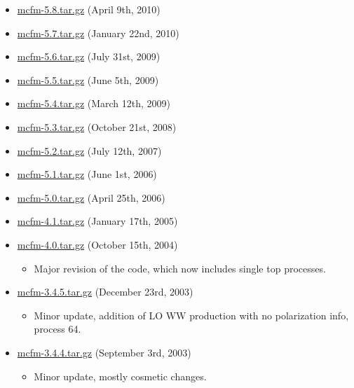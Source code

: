 \begin{itemize}
\item \href{https://mcfm.fnal.gov/downloads/mcfm-5.8.tar.gz}{mcfm-5.8.tar.gz} (April 9th, 2010)
\item \href{https://mcfm.fnal.gov/downloads/mcfm-5.7.tar.gz}{mcfm-5.7.tar.gz} (January 22nd, 2010)
\item \href{https://mcfm.fnal.gov/downloads/mcfm-5.6.tar.gz}{mcfm-5.6.tar.gz} (July 31st, 2009)
\item \href{https://mcfm.fnal.gov/downloads/mcfm-5.5.tar.gz}{mcfm-5.5.tar.gz} (June 5th, 2009)
\item \href{https://mcfm.fnal.gov/downloads/mcfm-5.4.tar.gz}{mcfm-5.4.tar.gz} (March 12th, 2009)
\item \href{https://mcfm.fnal.gov/downloads/mcfm-5.3.tar.gz}{mcfm-5.3.tar.gz} (October 21st, 2008)
\item \href{https://mcfm.fnal.gov/downloads/mcfm-5.2.tar.gz}{mcfm-5.2.tar.gz} (July 12th, 2007)
\item \href{https://mcfm.fnal.gov/downloads/mcfm-5.1.tar.gz}{mcfm-5.1.tar.gz} (June 1st, 2006)
\item \href{https://mcfm.fnal.gov/downloads/mcfm-5.0.tar.gz}{mcfm-5.0.tar.gz} (April 25th, 2006)
\item \href{https://mcfm.fnal.gov/downloads/mcfm-4.1.tar.gz}{mcfm-4.1.tar.gz} (January 17th, 2005)

\item \href{https://mcfm.fnal.gov/downloads/mcfm-4.0.tar.gz}{mcfm-4.0.tar.gz} (October 15th, 2004)
\begin{itemize}
\item Major revision of the code, which now includes single top processes.
\end{itemize}

\item \href{https://mcfm.fnal.gov/downloads/mcfm-3.4.5.tar.gz}{mcfm-3.4.5.tar.gz} (December 23rd, 2003)
\begin{itemize}
\item Minor update, addition of LO WW production with no polarization info, process 64.
\end{itemize}

\item \href{https://mcfm.fnal.gov/downloads/mcfm-3.4.4.tar.gz}{mcfm-3.4.4.tar.gz} (September 3rd, 2003)
\begin{itemize}
\item Minor update, mostly cosmetic changes.
\end{itemize}


\end{itemize}
